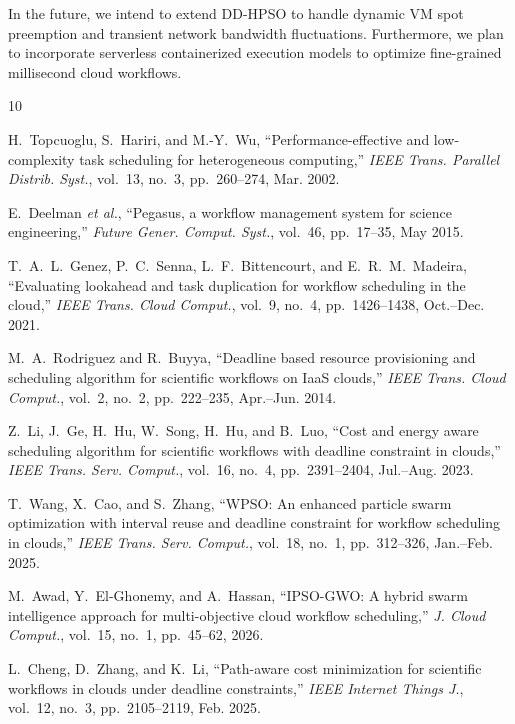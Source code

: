 \documentclass[journal]{IEEEtran}
\begin{document}
In the future, we intend to extend DD-HPSO to handle dynamic VM spot preemption and transient network bandwidth fluctuations. Furthermore, we plan to incorporate serverless containerized execution models to optimize fine-grained millisecond cloud workflows.

\begin{thebibliography}{10}

H.~Topcuoglu, S.~Hariri, and M.-Y.~Wu, ``Performance-effective and low-complexity task scheduling for heterogeneous computing,'' \textit{IEEE Trans. Parallel Distrib. Syst.}, vol.~13, no.~3, pp.~260--274, Mar. 2002.

E.~Deelman \textit{et al.}, ``Pegasus, a workflow management system for science engineering,'' \textit{Future Gener. Comput. Syst.}, vol.~46, pp.~17--35, May 2015.

T.~A.~L.~Genez, P.~C.~Senna, L.~F.~Bittencourt, and E.~R.~M.~Madeira, ``Evaluating lookahead and task duplication for workflow scheduling in the cloud,'' \textit{IEEE Trans. Cloud Comput.}, vol.~9, no.~4, pp.~1426--1438, Oct.--Dec. 2021.

M.~A.~Rodriguez and R.~Buyya, ``Deadline based resource provisioning and scheduling algorithm for scientific workflows on IaaS clouds,'' \textit{IEEE Trans. Cloud Comput.}, vol.~2, no.~2, pp.~222--235, Apr.--Jun. 2014.

Z.~Li, J.~Ge, H.~Hu, W.~Song, H.~Hu, and B.~Luo, ``Cost and energy aware scheduling algorithm for scientific workflows with deadline constraint in clouds,'' \textit{IEEE Trans. Serv. Comput.}, vol.~16, no.~4, pp.~2391--2404, Jul.--Aug. 2023.

T.~Wang, X.~Cao, and S.~Zhang, ``WPSO: An enhanced particle swarm optimization with interval reuse and deadline constraint for workflow scheduling in clouds,'' \textit{IEEE Trans. Serv. Comput.}, vol.~18, no.~1, pp.~312--326, Jan.--Feb. 2025.

M.~Awad, Y.~El-Ghonemy, and A.~Hassan, ``IPSO-GWO: A hybrid swarm intelligence approach for multi-objective cloud workflow scheduling,'' \textit{J. Cloud Comput.}, vol.~15, no.~1, pp.~45--62, 2026.

L.~Cheng, D.~Zhang, and K.~Li, ``Path-aware cost minimization for scientific workflows in clouds under deadline constraints,'' \textit{IEEE Internet Things J.}, vol.~12, no.~3, pp.~2105--2119, Feb. 2025.


\end{thebibliography}
\end{document}
